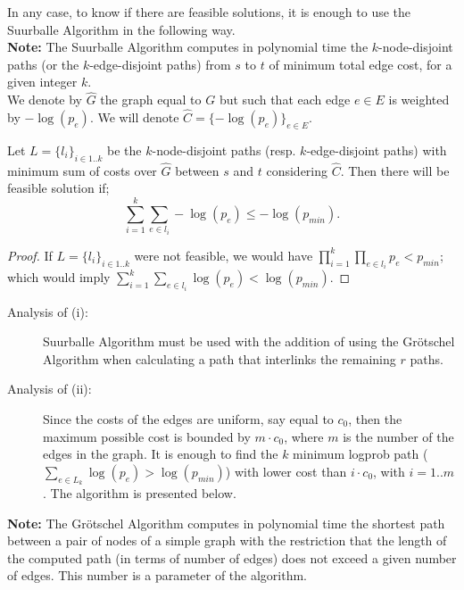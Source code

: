 \noindent In any case, to know if there are feasible solutions, it
is enough to use the Suurballe Algorithm \cite{119} in the following way.\\

\noindent \textbf{Note:} The Suurballe Algorithm \cite{119}\cite{118} computes in polynomial time the
$k$-node-disjoint paths (or the $k$-edge-disjoint paths) from $s$
to $t$ of minimum total edge cost, for a given integer $k$.\\

\noindent We denote by $\hat{G}$ the graph equal to $G$ but such
that each edge $e\in E$ is weighted by $-\log(p_{e})$. We will
denote
$\hat{C}=\{-\log(p_{e})\}_{e\in E}$.\\

\begin{proposition}
Let $L=\{l_{i}\}_{i\in 1..k}$ be the $k$-node-disjoint paths
(resp. $k$-edge-disjoint paths) with minimum sum of costs over
$\hat{G}$ between $s$ and $t$ considering $\hat{C}$. Then there
will be feasible solution if;
\[\sum^{k}_{i=1} \sum_{e\in l_{i}} -\log(p_{e})\leq -\log(p_{min}).\]
\end{proposition}
\begin{proof} If $L=\{l_{i}\}_{i\in 1..k}$ were not feasible, we would
have $\prod^{k}_{i=1}\prod_{e\in l_{i}} p_{e}<p_{min}$; which
would imply $\sum^{k}_{i=1} \sum_{e\in l_{i}} \log(p_{e})<
\log(p_{min})$. \end{proof}

\begin{description}
    \item[Analysis of (i):] Suurballe Algorithm must be used with
    the addition of using the Gr\"{o}tschel Algorithm when
    calculating a path that interlinks the remaining $r$ paths.
    \item[Analysis of (ii):] Since the costs of the edges are
    uniform, say equal to $c_{0}$, then the maximum possible cost
    is bounded by $m\cdot c_{0}$, where $m$ is the number of the
    edges in the graph. It is enough to find the $k$ minimum
    logprob path ($\sum_{e\in L_{k}} \log(p_{e})>\log(p_{min})$) with lower cost than $i\cdot
    c_{0}$, with $i=1..m$. The algorithm is presented below.
\end{description}

\noindent \textbf{Note:} The Gr\"{o}tschel Algorithm \cite{120} computes in polynomial time the shortest
path between a pair of nodes of a simple graph with the
restriction that the length of the computed path (in terms of
number of edges) does not exceed a given number of edges. This
number is a parameter of the algorithm.\\

